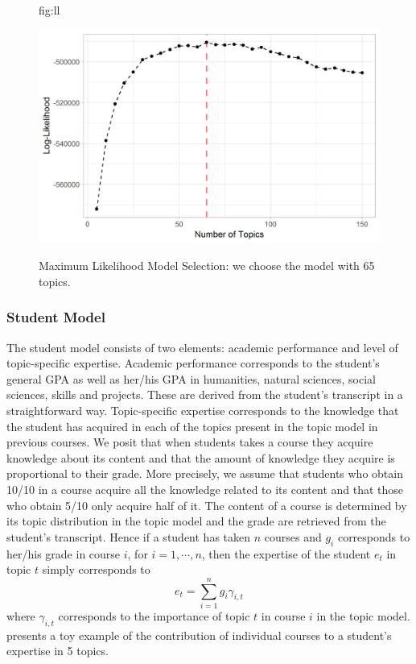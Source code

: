 \documentclass[pmlr]{jmlr}%
\begin{document}
\begin{figure}[htbp]
	\floatconts
	{fig:ll}
	{\caption{Maximum Likelihood Model Selection: we choose the model with 65 topics.}}
	{\includegraphics[width=0.5\linewidth]{figures/model-selection}}
\end{figure}

\subsubsection{Student Model}
\label{sec:sm}
The student model consists of two elements: academic performance and level of topic-specific expertise. Academic performance corresponds to the student's general GPA as well as her/his GPA in humanities, natural sciences, social sciences, skills and projects. These are derived from the student's transcript in a straightforward way. Topic-specific expertise corresponds to the knowledge that the student has acquired in each of the topics present in the topic model in previous courses. We posit that when students takes a course they acquire knowledge about its content and that the amount of knowledge they acquire is proportional to their grade. More precisely, we assume that students who obtain 10/10 in a course acquire all the knowledge related to its content and that those who obtain 5/10 only acquire half of it. The content of a course is determined by its topic distribution in the topic model and the grade are retrieved from the student's transcript. Hence if a student has taken $n$ courses and  $g_{i}$ corresponds to her/his grade in  course $i$, for $i = 1, \cdots, n$, then the expertise of the student $e_t$ in topic $t$ simply corresponds to $$e_t = \sum_{i= 1}^{n} g_i \gamma_{i,t}$$ where $\gamma_{i,t}$ corresponds to the importance of topic $t$ in course $i$ in the topic model.  presents a toy example of the contribution of individual courses to a student's expertise in 5 topics.
\end{document}
